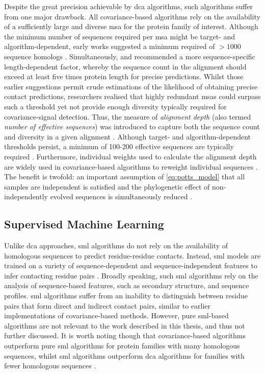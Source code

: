 Despite the great precision achievable by \gls{dca} algorithms, such algorithms suffer from one major drawback. All covariance-based algorithms rely on the availability of a sufficiently large and diverse \gls{msa} for the protein family of interest. Although the minimum number of sequences required per \gls{msa} might be target- and algorithm-dependent, early works suggested a minimum required of $>1000$ sequence homologs \cite{Jones2012-ks,Marks2012-ko,Andreani2015-qn}. Simultaneously, \textcite{Marks2011-os} and \textcite{Kamisetty2013-le} recommended a more sequence-specific length-dependent factor, whereby the sequence count in the alignment should exceed at least five times protein length for precise predictions. Whilst those earlier suggestions permit crude estimations of the likelihood of obtaining precise contact predictions, researchers realised that highly redundant \gls{msa}s could surpass such a threshold yet not provide enough diversity typically required for covariance-signal detection. Thus, the measure of \textit{alignment depth} (also termed \textit{number of effective sequences}) was introduced to capture both the sequence count and diversity in a given alignment \cite{Morcos2011-lk,Hopf2012-zl,Skwark2014-qp,Jones2015-vq}. Although target- and algorithm-dependent thresholds persist, a minimum of 100-200 effective sequences are typically required \cite{Skwark2014-qp,Jones2015-vq}. Furthermore, individual weights used to calculate the alignment depth are widely used in covariance-based algorithms to reweight individual sequences \cite{Ekeberg2013-ay}. The benefit is twofold: an important assumption of \cref{eq:potts_model} that all samples are independent is satisfied and the phylogenetic effect of non-independently evolved sequences is simultaneously reduced \cite{Ekeberg2013-ay}.

\subsection{Supervised Machine Learning}
Unlike \gls{dca} approaches, \acrlong{sml} algorithms do not rely on the availability of homologous sequences to predict residue-residue contacts. Instead, \gls{sml} models are trained on a variety of sequence-dependent and sequence-independent features to infer contacting residue pairs \cite{Du2016-hl,Gonzalez2013-wg,Shackelford2007-iz,Cheng2005-da,Zhang2016-px,Wang2013-wi}. Broadly speaking, such \gls{sml} algorithms rely on the analysis of sequence-based features, such as secondary structure, and sequence profiles. \Gls{sml} algorithms suffer from an inability to distinguish between residue pairs that form direct and indirect contact pairs, similar to earlier implementations of covariance-based methods. However, pure \gls{sml}-based algorithms are not relevant to the work described in this thesis, and thus not further discussed. It is worth noting though that covariance-based algorithms outperform pure \gls{sml} algorithms for protein families with many homologous sequences, whilst \gls{sml} algorithms outperform \gls{dca} algorithms for families with fewer homologous sequences \cite{Skwark2014-qp,Wang2013-wi,Ma2015-vo}. 

